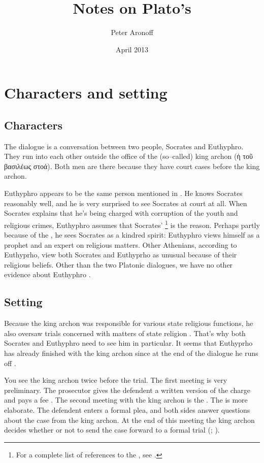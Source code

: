 \documentclass[10pt]{article}
\begin{document}
\title{Notes on Plato's }
\author{Peter Aronoff}
\date{April 2013}
\maketitle

\section{Characters and setting}

\subsection{Characters}

The dialogue is a conversation between two people, Socrates and Euthyphro.
They run into each other outside the office of the (so--called) king archon
(ἡ τοῦ βασιλέως στοά).  Both men are there because they have court cases
before the king archon.

Euthyphro appears to be the same person mentioned in 
\citep[85]{burnet1924}.  He knows Socrates reasonably well, and he is very
surprised to see Socrates at court at all.  When Socrates explains that
he's being charged with corruption of the youth and religious crimes,
Euthyphro assumes that Socrates' \footnote{For
a complete list of references to the , see \citealp[page
32]{bailly2003}.} is the reason.  Perhaps partly because of the
, he sees Socrates as a kindred spirit: Euthyphro views
himself as a prophet and an expert on religious matters.  Other Athenians,
according to Euthyprho, view both Socrates and Euthyprho as unusual because
of their religious beliefs.  Other than the two Platonic dialogues, we have
no other evidence about Euthyphro \cite[16]{bailly2003}.

\subsection{Setting}

Because the king archon was responsible for various state religious
functions, he also oversaw trials concerned with matters of state religion
\citep[82--83]{burnet1924}.  That's why both Socrates and Euthyphro need to
see him in particular.  It seems that Euthyprho has already finished with
the king archon since at the end of the dialogue he runs off
\citep[82]{burnet1924}.

You see the king archon twice before the trial. The first meeting is very
preliminary. The prosecutor gives the defendent a written version of the
charge and pays a fee \citep[7--8]{brickhouse2004}. The second meeting with
the king archon is the . The  is more
elaborate. The defendent enters a formal plea, and both sides answer
questions about the case from the king archon.  At the end of this meeting
the king archon decides whether or not to send the case forward to a formal
trial (\citealp[82--83]{burnet1924}; \citealp[8]{brickhouse2004}).



\end{document}
